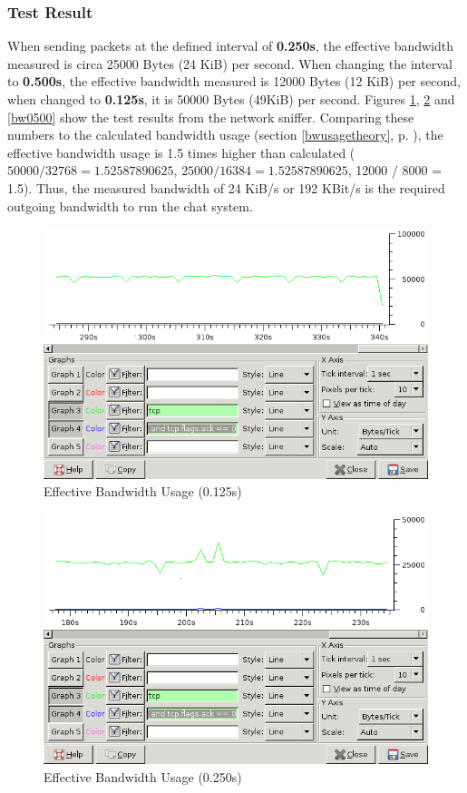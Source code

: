 \subsubsection{Test Result}
When sending packets at the defined interval of
\textbf{0.250s}, the effective bandwidth measured is
circa 25000 Bytes (24 KiB) per second.
When changing the interval to \textbf{0.500s},
the effective bandwidth measured is
12000 Bytes (12 KiB) per second, when changed
to \textbf{0.125s}, it is 50000 Bytes (49KiB) per second.
Figures \ref{bw0125}, \ref{bw0250} and
\ref{bw0500} show the test results from the network sniffer.
Comparing these numbers to the calculated bandwidth usage
(section \ref{bwusagetheory}, p. \pageref{bwusagetheory}),
the effective bandwidth usage is 1.5 times higher than 
calculated ($50000 / 32768 = 1.52587890625$, $25000 / 16384 = 1.52587890625$,
12000 / 8000 = 1.5). Thus, the measured bandwidth of 24 KiB/s or
192 KBit/s is the required outgoing bandwidth to run the chat system.
\begin{figure}[htbp]
\caption{Effective Bandwidth Usage (0.125s)}
\label{bw0125}
\centering
\includegraphics[scale=0.5]{bandwidth-0125.png}
\end{figure}
\begin{figure}[htbp]
\caption{Effective Bandwidth Usage (0.250s)}
\label{bw0250}
\centering
\includegraphics[scale=0.5]{bandwidth-0250.png}
\end{figure}
